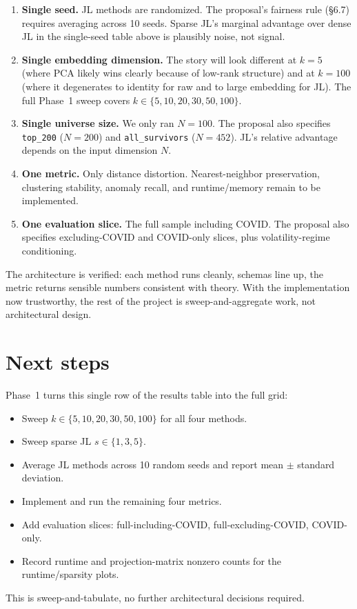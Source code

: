 \documentclass[11pt]{article}
\begin{document}
\begin{enumerate}
    \item \textbf{Single seed.} JL methods are randomized. The proposal's fairness rule (\S6.7) requires averaging across 10 seeds. Sparse JL's marginal advantage over dense JL in the single-seed table above is plausibly noise, not signal.
    \item \textbf{Single embedding dimension.} The story will look different at $k = 5$ (where PCA likely wins clearly because of low-rank structure) and at $k = 100$ (where it degenerates to identity for raw and to large embedding for JL). The full Phase~1 sweep covers $k \in \{5, 10, 20, 30, 50, 100\}$.
    \item \textbf{Single universe size.} We only ran $N = 100$. The proposal also specifies \texttt{top\_200} ($N = 200$) and \texttt{all\_survivors} ($N = 452$). JL's relative advantage depends on the input dimension $N$.
    \item \textbf{One metric.} Only distance distortion. Nearest-neighbor preservation, clustering stability, anomaly recall, and runtime/memory remain to be implemented.
    \item \textbf{One evaluation slice.} The full sample including COVID. The proposal also specifies excluding-COVID and COVID-only slices, plus volatility-regime conditioning.
\end{enumerate}

The architecture is verified: each method runs cleanly, schemas line up, the metric returns sensible numbers consistent with theory. With the implementation now trustworthy, the rest of the project is sweep-and-aggregate work, not architectural design.

\section{Next steps}

Phase~1 turns this single row of the results table into the full grid:
\begin{itemize}
    \item Sweep $k \in \{5, 10, 20, 30, 50, 100\}$ for all four methods.
    \item Sweep sparse JL $s \in \{1, 3, 5\}$.
    \item Average JL methods across 10 random seeds and report mean $\pm$ standard deviation.
    \item Implement and run the remaining four metrics.
    \item Add evaluation slices: full-including-COVID, full-excluding-COVID, COVID-only.
    \item Record runtime and projection-matrix nonzero counts for the runtime/sparsity plots.
\end{itemize}
This is sweep-and-tabulate, no further architectural decisions required.
\end{document}
